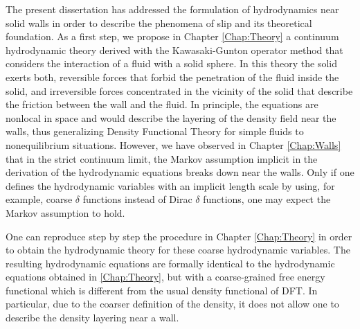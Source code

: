 \documentclass[b5paper,openright,10pt]{book}
\begin{document}
The present dissertation has addressed the formulation of hydrodynamics near solid walls in order to describe the phenomena of slip and its theoretical foundation.
As a first step, we propose in Chapter \ref{Chap:Theory} a continuum hydrodynamic theory 
derived with the Kawasaki-Gunton operator method that considers the interaction of a fluid with a solid sphere. 
In  
this theory
the  solid  exerts both,  reversible  forces  that
forbid the penetration of the fluid inside the solid, and irreversible
forces concentrated  in the  vicinity of the  solid that  describe the
friction between the  wall and the fluid. In  principle, the equations
are nonlocal in space and would  describe the layering of the density
field near the walls, thus  generalizing Density Functional Theory for
simple  fluids  to  nonequilibrium   situations.   However,  we  have
observed in Chapter \ref{Chap:Walls} that in the  strict continuum  limit, the
Markov  assumption  implicit in  the  derivation  of the  hydrodynamic
equations breaks down  near the  walls.
Only if one defines the hydrodynamic variables with an implicit length
scale    by   using,    for    example,    coarse   $\delta$    functions
instead  of Dirac $\delta$ functions,  one may expect
the Markov assumption to hold.

One  can  reproduce  step  by  step  the  procedure  in  Chapter \ref{Chap:Theory}
 in order  to  obtain the  hydrodynamic theory  for
these  coarse  hydrodynamic  variables.   The  resulting  hydrodynamic
equations  are  formally  identical   to  the  hydrodynamic  equations
obtained in \ref{Chap:Theory}, but with  a coarse-grained free
energy functional which is different from the usual density functional
of DFT.  In particular, due to  the coarser definition of the density,
it does not allow one to describe the density layering near a wall.

\end{document}
